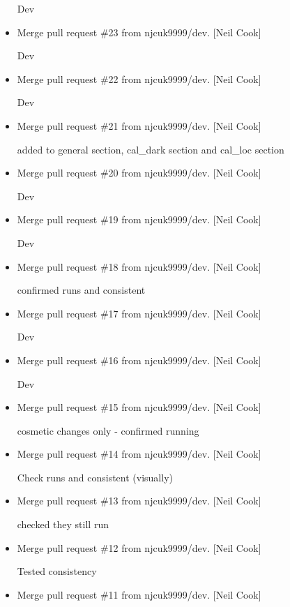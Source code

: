 \documentclass[a4paper,10pt,english]{report}
\begin{document}
\begin{itemize}
Dev

\item {} 
Merge pull request \#23 from njcuk9999/dev. {[}Neil Cook{]}

Dev

\item {} 
Merge pull request \#22 from njcuk9999/dev. {[}Neil Cook{]}

Dev

\item {} 
Merge pull request \#21 from njcuk9999/dev. {[}Neil Cook{]}

added to general section, cal\_dark section and cal\_loc section

\item {} 
Merge pull request \#20 from njcuk9999/dev. {[}Neil Cook{]}

Dev

\item {} 
Merge pull request \#19 from njcuk9999/dev. {[}Neil Cook{]}

Dev

\item {} 
Merge pull request \#18 from njcuk9999/dev. {[}Neil Cook{]}

confirmed runs and consistent

\item {} 
Merge pull request \#17 from njcuk9999/dev. {[}Neil Cook{]}

Dev

\item {} 
Merge pull request \#16 from njcuk9999/dev. {[}Neil Cook{]}

Dev

\item {} 
Merge pull request \#15 from njcuk9999/dev. {[}Neil Cook{]}

cosmetic changes only - confirmed running

\item {} 
Merge pull request \#14 from njcuk9999/dev. {[}Neil Cook{]}

Check runs and consistent (visually)

\item {} 
Merge pull request \#13 from njcuk9999/dev. {[}Neil Cook{]}

checked they still run

\item {} 
Merge pull request \#12 from njcuk9999/dev. {[}Neil Cook{]}

Tested consistency

\item {} 
Merge pull request \#11 from njcuk9999/dev. {[}Neil Cook{]}


\end{itemize}
\end{document}
